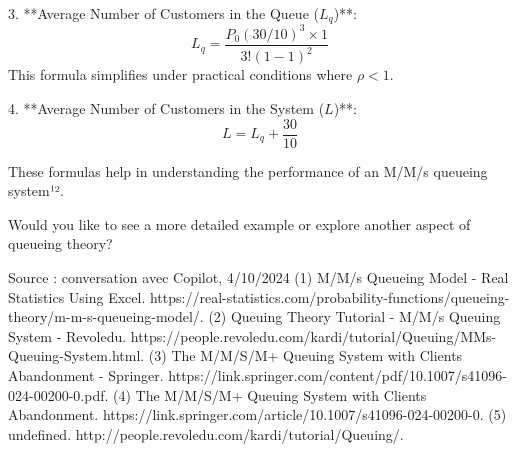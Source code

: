 \documentclass[a4paper12pt]{article}
\begin{document}
3. **Average Number of Customers in the Queue (\(L_q\))**:
   $$L_q = \frac{P_0 (30/10)^3 \times 1}{3! (1 - 1)^2}$$
   This formula simplifies under practical conditions where \(\rho < 1\).

4. **Average Number of Customers in the System (\(L\))**:
   $$L = L_q + \frac{30}{10}$$

These formulas help in understanding the performance of an M/M/s queueing system¹².

Would you like to see a more detailed example or explore another aspect of queueing theory?

Source : conversation avec Copilot, 4/10/2024
(1) M/M/s Queueing Model - Real Statistics Using Excel. https://real-statistics.com/probability-functions/queueing-theory/m-m-s-queueing-model/.
(2) Queuing Theory Tutorial - M/M/s Queuing System - Revoledu. https://people.revoledu.com/kardi/tutorial/Queuing/MMs-Queuing-System.html.
(3) The M/M/S/M+ Queuing System with Clients Abandonment - Springer. https://link.springer.com/content/pdf/10.1007/s41096-024-00200-0.pdf.
(4) The M/M/S/M+ Queuing System with Clients Abandonment. https://link.springer.com/article/10.1007/s41096-024-00200-0.
(5) undefined. http://people.revoledu.com/kardi/tutorial/Queuing/.
\end{document}
